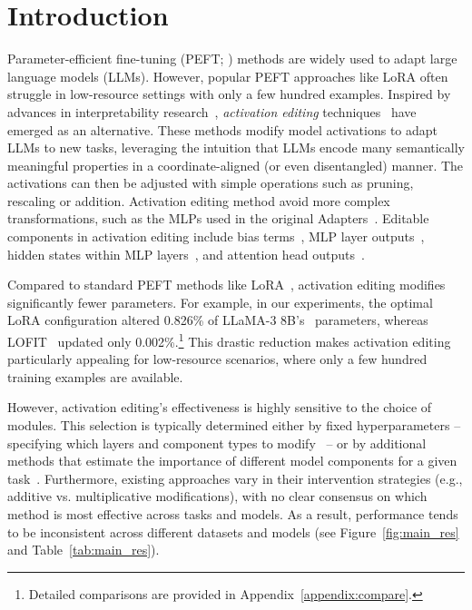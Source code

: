 \section{Introduction}
\label{sec:intro}
Parameter-efficient fine-tuning (PEFT; \citealp{han2024parameter}) methods are widely used to adapt large language models (LLMs). However, popular PEFT approaches like LoRA \cite{hu2021lora} often struggle in low-resource settings with only a few hundred examples. Inspired by advances in interpretability research~\cite{vig2020causal,zhang2023towards}, {\it activation editing} techniques~\cite{wu-etal-2024-advancing,yin2024lofit} have emerged as an alternative. These methods modify model activations to adapt LLMs to new tasks, leveraging the intuition that LLMs encode many semantically meaningful properties in a  coordinate-aligned (or even disentangled) manner. The activations can then be adjusted with simple operations such as pruning, rescaling or addition. 
Activation editing method avoid more complex transformations, such as the MLPs used in the original Adapters~\cite{houlsby2019parameter}. 
Editable components in activation editing  include bias terms~\cite{ben-zaken-etal-2022-bitfit}, MLP layer outputs~\cite{wu-etal-2024-advancing}, hidden states within MLP layers~\cite{wu2024reft}, and attention head outputs~\cite{yin2024lofit}.

Compared to standard PEFT methods like LoRA~\cite{hu2021lora}, activation editing modifies significantly fewer parameters. For example, in our experiments, the optimal LoRA configuration altered 0.826\% of LLaMA-3 8B’s~\cite{dubey2024llama} parameters, whereas LOFIT~\cite{yin2024lofit} updated only 0.002\%.\footnote{Detailed comparisons are provided in Appendix~\ref{appendix:compare}.} This drastic reduction makes activation editing particularly appealing for low-resource scenarios, where only a few hundred training examples are available.




However, activation editing’s effectiveness is highly sensitive to the choice of modules. %
This selection is typically determined either by fixed hyperparameters -- specifying which layers and component types to modify~\cite{ben-zaken-etal-2022-bitfit,wu2024reft} -- or by additional methods that estimate the importance of different model components for a given task~\cite{yin2024lofit}. 
Furthermore, existing approaches vary in their intervention strategies (e.g., additive vs. multiplicative modifications), with no clear consensus on which method is most effective across tasks and models.
As a result, performance tends to be inconsistent across different datasets and models (see Figure~\ref{fig:main_res} and Table~\ref{tab:main_res}).

